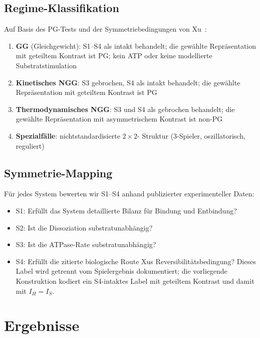 \documentclass[12pt,a4paper]{article}
\begin{document}
\subsection{Regime-Klassifikation}

Auf Basis des PG-Tests und der Symmetriebedingungen von Xu~\cite{Xu2022}:
\begin{enumerate}
  \item \textbf{GG} (Gleichgewicht): S1--S4 als intakt behandelt; die
    gewählte Repräsentation mit geteiltem Kontrast ist PG; kein ATP oder
    keine modellierte Substratstimulation
  \item \textbf{Kinetisches NGG}: S3 gebrochen, S4 als intakt behandelt;
    die gewählte Repräsentation mit geteiltem Kontrast ist PG
  \item \textbf{Thermodynamisches NGG}: S3 und S4 als gebrochen
    behandelt; die gewählte Repräsentation mit asymmetrischem Kontrast
    ist non-PG
  \item \textbf{Spezialfälle}: nichtstandardisierte $2\times 2$-
    Struktur (3-Spieler, oszillatorisch, reguliert)
\end{enumerate}

\subsection{Symmetrie-Mapping}

Für jedes System bewerten wir S1--S4 anhand publizierter experimenteller
Daten:
\begin{itemize}
  \item S1: Erfüllt das System detaillierte Bilanz für Bindung und
    Entbindung?
  \item S2: Ist die Dissoziation substratunabhängig?
  \item S3: Ist die ATPase-Rate substratunabhängig?
  \item S4: Erfüllt die zitierte biologische Route Xus
    Reversibilitätsbedingung? Dieses Label wird getrennt vom
    Spielergebnis dokumentiert; die vorliegende Konstruktion kodiert ein
    S4-intaktes Label mit geteiltem Kontrast und damit mit $I_H=I_S$.
\end{itemize}


\section{Ergebnisse}

\end{document}

